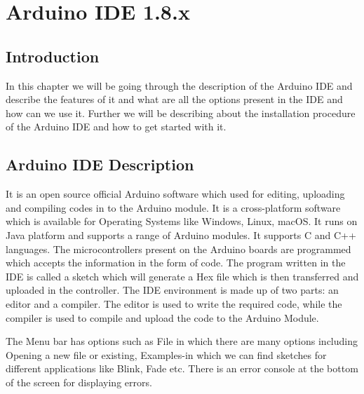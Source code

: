%
%



\chapter{Arduino IDE 1.8.x}\label{ArduinoIDE}



\section{Introduction}

In this chapter we will be going through the description of the Arduino IDE and describe  the features of it and what are all the options present in the IDE and how can we use it. Further we will be describing about the installation procedure of the Arduino IDE and how to get started with it.

\section{Arduino IDE Description}

It is an open source official Arduino software which used for editing, uploading and compiling codes in to the Arduino module. It is a cross-platform software which is available for Operating Systems like Windows, Linux, macOS. It runs on Java platform and supports a range of Arduino modules. It supports C and C++ languages. The microcontrollers present on the Arduino boards are programmed which accepts the information in the form of code. The program written in the IDE is called a sketch which will generate a Hex file which is then transferred and uploaded in the controller. The IDE environment is made up of two parts: an editor and a compiler. The editor is used to write the required code, while the compiler is used to compile and upload the code to the Arduino Module.\cite{Fezari:2018}

The Menu bar has options such as File in which there are many options including Opening a new file or existing,  Examples-in which we can find sketches for different applications like Blink, Fade etc.  There is an error console at the bottom  of the screen for displaying errors.
 
